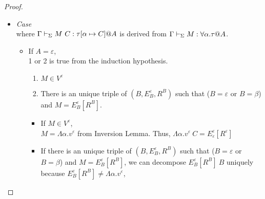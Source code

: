 \begin{proof}
\begin{itemize}
		\item \textit{Case} \TIns\\
			  where \(\Gamma \vdash_\Sigma M\ C :\tau[\alpha \mapsto C] @ A\) is derived from \(\Gamma \vdash_\Sigma M : \forall\alpha.\tau @ A\).
		      		      	      	      	      	      	      	      	      	      	      	      	      		      	      	      	      
		      \begin{itemize}
		      	\item If $ A = \varepsilon$,\\
		      	      1 or 2 is true from the induction hypothesis.
		      	      \begin{enumerate}
		      	      	\item $ M \in V^\varepsilon$
		      	      	\item There is an unique triple of $(B, E^\varepsilon_B, R^B)$ such that ($B = \varepsilon$ or $B = \beta$) and $M = E^\varepsilon_B[R^B]$.
		      	      \end{enumerate}
		      	      		      	      	      	      	      	      	      	      	      	      	      	      	      	      	      	      	      	      	      	      	      	      	      	      		      	      	      	      	      	      	      	      
		      	      \begin{itemize}
		      	      	\item If $ M \in V^\varepsilon$,\\
		      	      	    $ M = \Lambda\alpha.v^\varepsilon$ from Inversion Lemma.
		      	      	    Thus, $ \Lambda\alpha.v^\varepsilon\ C = E^\varepsilon_\varepsilon [R^\varepsilon]$
		      	      	\item If there is an unique triple of $(B, E^\varepsilon_B, R^B)$ such that ($B = \varepsilon$ or $B = \beta$) and $M = E^\varepsilon_B[R^B]$,
		      	      		we can decompose $E^\varepsilon_B[R^B]\ B$ uniquely
		      	      	    because $ E^\varepsilon_B[R^B] \neq \Lambda\alpha.v^\varepsilon$, 
		      	      \end{itemize}
		      	      		      	      	      	      	      	      	      	      	      	      	      	      	      	      	      	      	      	      	      	      	      	      	      	      		      	      	      	      	      	      	      	      

\end{itemize}
\end{itemize}
\end{proof}
